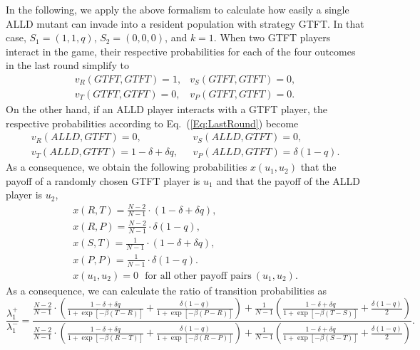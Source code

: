 \documentclass[11pt]{article}
\theoremstyle{plainCl1}
\theoremstyle{plainCl2}
\begin{document}
In the following, we apply the above formalism to calculate how easily a single ALLD mutant can invade into a resident population with strategy GTFT. In that case, $S_1=(1,1,q)$, $S_2\!=\!(0,0,0)$, and $k\!=\!1$. When two GTFT players interact in the game, their respective probabilities for each of the four outcomes in the last round simplify to
\begin{equation}
\begin{array}{cc}
v_R(GTFT,GTFT)=1, &v_S(GTFT,GTFT)=0,\\
v_T(GTFT,GTFT)=0, &v_P(GTFT,GTFT)=0.
\end{array}
\end{equation}
On the other hand, if an ALLD player interacts with a GTFT player, the respective probabilities according to Eq.~(\ref{Eq:LastRound}) become
\begin{equation}
\begin{array}{ll}
v_R(ALLD,GTFT)=0,	&v_S(ALLD,GTFT)=0,\\
v_T(ALLD,GTFT)=1\!-\!\delta+\delta q,~~~ 	&v_P(ALLD,GTFT)=\delta(1\!-\!q).
\end{array}
\end{equation}
As a consequence, we obtain the following probabilities $x(u_1,u_2)$ that the payoff of a randomly chosen GTFT player is $u_1$ and that the payoff of the ALLD player is $u_2$,
\begin{equation}
\begin{array}{l}
\displaystyle x(R,T)=\frac{N-2}{N-1} \cdot (1\!-\!\delta\!+\!\delta q),\\[0.5cm]
\displaystyle x(R,P)=\frac{N-2}{N-1} \cdot \delta(1\!-\!q),\\[0.5cm]
\displaystyle x(S,T)=\frac{1}{N-1} \cdot (1\!-\!\delta\!+\!\delta q), \\[0.5cm]
\displaystyle x(P,P)=\frac{1}{N-1} \cdot \delta(1\!-\!q). \\[0.5cm]
\displaystyle x(u_1,u_2)=0	~~~\text{for all other payoff pairs}~(u_1,u_2).
\end{array}
\end{equation}
As a consequence, we can calculate the ratio of transition probabilities as 
\begin{equation}
\frac{\lambda_1^+}{\lambda_1^-}=\displaystyle \frac{\displaystyle \frac{N-2}{N-1} \cdot \left(\frac{1\!-\!\delta\!+\!\delta q}{1\!+\!\exp[-\beta(T\!-\!R)]}
\!+\! \frac{\delta(1-q)}{1\!+\!\exp[-\beta(P\!-\!R)]}\right)
+ \frac{1}{N\!-\!1} \left(\frac{1-\delta+\delta q}{1+\exp[-\beta (T\!-\!S)]}
\!+\! \frac{\delta(1-q)}{2}\right)}
{\displaystyle \frac{N-2}{N-1} \cdot \left(\frac{1\!-\!\delta\!+\!\delta q}{1\!+\!\exp[-\beta(R\!-\!T)]}
\!+\! \frac{\delta(1-q)}{1\!+\!\exp[-\beta(R\!-\!P)]}\right)
+ \frac{1}{N\!-\!1} \left(\frac{1-\delta+\delta q}{1+\exp[-\beta (S\!-\!T)]}
\!+\! \frac{\delta(1-q)}{2}\right)}.
\end{equation}
\end{document}
